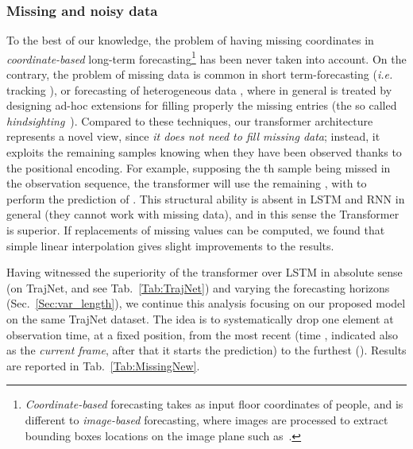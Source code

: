\documentclass[a4paper,conference]{IEEEtran}
\begin{document}
\subsubsection{Missing and noisy data \label{Sec:missing}}
To the best of our knowledge, the problem of having missing coordinates in \emph{coordinate-based} long-term forecasting\footnote{\emph{Coordinate-based} forecasting takes as input floor coordinates of people, and is different to \emph{image-based} forecasting, where images are processed to extract bounding boxes locations on the image plane such as~\cite{kitani2012activity}.}  has been never taken into account. On the contrary, the problem of missing data is common in short term-forecasting (\emph{i.e.} tracking \cite{bae2017confidence}), or forecasting of heterogeneous data \cite{anava2015online,chen2001study,rodrigues2013spectral,ghazi2018robust,golyandina2007caterpillar}, where in general is treated by designing ad-hoc extensions for filling properly the missing entries (the so called \emph{hindsighting}~\cite{anava2015online}). 
Compared to these techniques, our transformer architecture represents a novel view, since \emph{it does not need to fill missing data}; instead, it exploits the remaining samples knowing when they have been observed thanks to the positional encoding. For example, supposing the th sample being missed in the observation sequence, the transformer will use the remaining , with  to perform the prediction of . This structural ability is absent in LSTM and RNN in general (they cannot work with missing data), and in this sense the Transformer is superior. If replacements of missing values can be computed, we found that simple linear interpolation gives slight improvements to the results.

Having witnessed the superiority of the transformer over LSTM in absolute sense (on TrajNet, and see Tab.~\ref{Tab:TrajNet}) and varying the forecasting horizons (Sec.~\ref{Sec:var_length}), we continue this analysis focusing on our proposed model on the same TrajNet dataset. The idea is to systematically drop one element at observation time, at a fixed position, from the most recent (time , indicated also as the \emph{current frame}, after that it starts the prediction) to the furthest ().
Results are reported in Tab.~\ref{Tab:MissingNew}.
\end{document}
